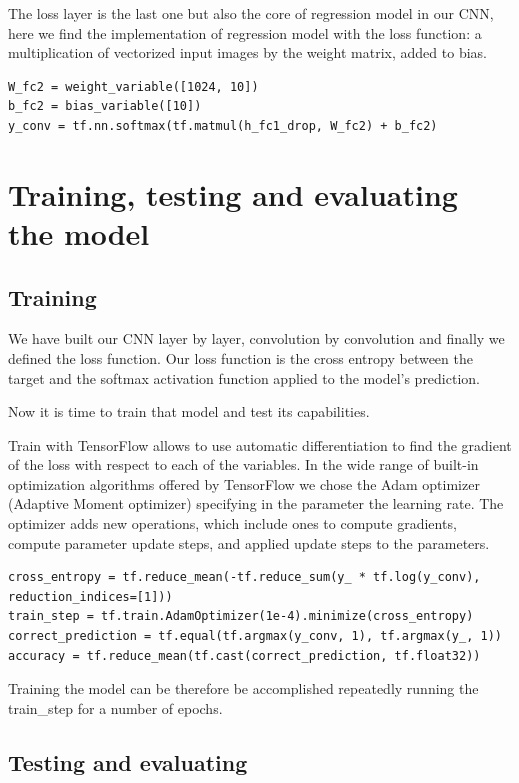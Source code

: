 The loss layer is the last one but also the core of regression model in our \acs{CNN}, here we find the implementation of regression model with the loss function: a multiplication of vectorized input images by the weight matrix, added to bias.

\begin{lstlisting}
W_fc2 = weight_variable([1024, 10])
b_fc2 = bias_variable([10])
y_conv = tf.nn.softmax(tf.matmul(h_fc1_drop, W_fc2) + b_fc2)
\end{lstlisting}

\section{Training, testing and evaluating the model}

\subsection{Training}

We have built our \acs{CNN} layer by layer, convolution by convolution and finally we defined the loss function. Our loss function is the cross entropy between the target and the softmax activation function applied to the model's prediction.

Now it is time to train that model and test its capabilities.

Train with TensorFlow allows to use automatic differentiation to find the gradient of the loss with respect to each of the variables. In the wide range of built-in optimization algorithms offered by TensorFlow we chose the Adam optimizer (Adaptive Moment optimizer) specifying in the parameter the learning rate. The optimizer adds new operations, which include ones to compute gradients, compute parameter update steps, and applied update steps to the parameters.

\begin{lstlisting}
cross_entropy = tf.reduce_mean(-tf.reduce_sum(y_ * tf.log(y_conv), reduction_indices=[1]))
train_step = tf.train.AdamOptimizer(1e-4).minimize(cross_entropy)
correct_prediction = tf.equal(tf.argmax(y_conv, 1), tf.argmax(y_, 1))
accuracy = tf.reduce_mean(tf.cast(correct_prediction, tf.float32))
\end{lstlisting}

Training the model can be therefore be accomplished repeatedly running the train\_step for a number of epochs.

\subsection{Testing and evaluating}

